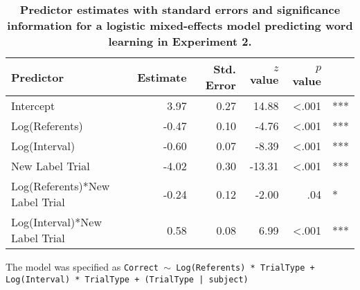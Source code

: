 \documentclass{pnastwo}
\begin{document}
\begin{table}[ht]
\centering
\parbox{10cm}{\caption{\textbf{Predictor estimates with standard errors and significance information for a logistic mixed-effects model predicting word learning in Experiment 2.}}}
\begin{tabular}{lrrrrl}
 Predictor & Estimate & Std. Error & $z$ value & $p$ value &  \\ 
  \hline
Intercept & 3.97 & 0.27 & 14.88 & <.001 & *** \\ 
  Log(Referents) & -0.47 & 0.10 & -4.76 & <.001 & *** \\ 
  Log(Interval) & -0.60 & 0.07 & -8.39 & <.001 & *** \\ 
  New Label Trial & -4.02 & 0.30 & -13.31 & <.001 & *** \\ 
  Log(Referents)*New Label Trial & -0.24 & 0.12 & -2.00 & .04 & * \\ 
  Log(Interval)*New Label Trial & 0.58 & 0.08 & 6.99 & <.001 & *** \\ 
   \hline
\end{tabular}
\vspace{6pt}
\parbox{10cm}{The model was specified as \small{\tt{Correct $\sim$ Log(Referents) * TrialType + Log(Interval) * TrialType + (TrialType | subject)}}}
\label{tab:exp2_reg}
\end{table}
\end{document}

